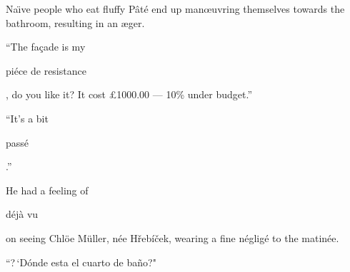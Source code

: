 \documentclass[a4paper, 12pt]{article}
\begin{document}
Na\"{\i}ve people who eat fluffy P\^at\'e end up man\oe uvring themselves towards the bathroom, resulting in an \ae ger.

“The fa\c{c}ade is my \begin{slshape}pi\'ece de resistance \end{slshape}, do you like it? It cost \pounds 1000.00 — 10\% under budget.”

“It’s a bit \begin{slshape}pass\'e \end{slshape}.”

He had a feeling of \begin{slshape} d\'ej\`a vu\end{slshape} on seeing Chl\"{o}e M\"{u}ller, n\'ee H\v{r}eb\'i\v{c}ek, wearing a fine n\'{e}glig\'e to the matin\'ee.

“?\,‘D\'onde esta el cuarto de ba\~{n}o?"
\end{document}
